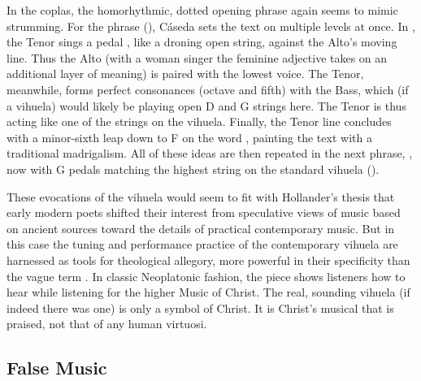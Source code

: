In the coplas, the homorhythmic, dotted opening phrase again seems to mimic
strumming.
For the phrase  (),
Cáseda sets the text on multiple levels at once.
In , the Tenor sings a pedal , like a droning open
string, against the Alto's moving line.
Thus the  Alto (with a woman singer the feminine adjective takes
on an additional layer of meaning) is paired with the lowest voice.
The Tenor, meanwhile, forms perfect consonances (octave and fifth) with the
Bass, which (if a vihuela) would likely be playing open D and G strings here. 
The Tenor is thus acting like one of the strings on the vihuela.
Finally, the Tenor line concludes with a minor-sixth leap down to F\sh{} on the
word , painting the text with a traditional madrigalism.
All of these ideas are then repeated in the next phrase, , now
with G pedals matching the highest string on the standard vihuela
().

These evocations of the vihuela would seem to fit with Hollander's thesis that
early modern poets shifted their interest from speculative views of music based
on ancient sources toward the details of practical contemporary music.
But in this case the tuning and performance practice of the contemporary
vihuela are harnessed as tools for theological allegory, more powerful in their
specificity than the vague term .
In classic Neoplatonic fashion, the piece shows listeners how to hear
 while listening for the higher Music of Christ. 
The real, sounding vihuela (if indeed there was one) is only a symbol of Christ.
It is Christ's musical  that is praised, not that of any
human virtuosi.

\subsection{False Music}

